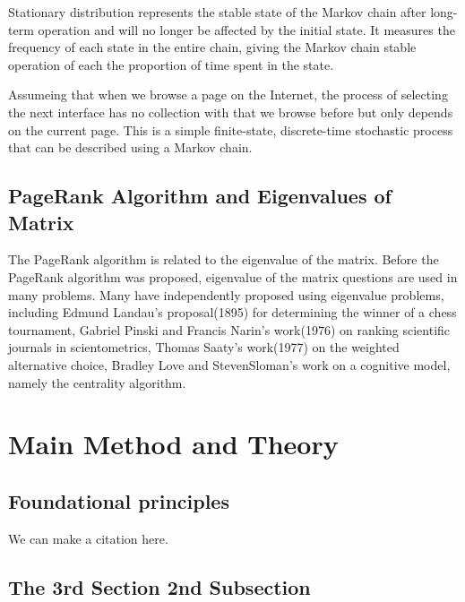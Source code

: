 \documentclass[lettersize,journal,12pt]{IEEEtran}
\begin{document}
Stationary distribution represents the stable state of the Markov chain after long-term operation and will no longer be affected by the initial state.
It measures the frequency of each state in the entire chain, giving the Markov chain stable operation of each
the proportion of time spent in the state.

Assumeing that when we browse a page on the Internet, the process of selecting the next interface has no collection with that we browse before but only depends on the current page. This is a simple finite-state, discrete-time stochastic process that can be described using a Markov chain.

\subsection{PageRank Algorithm and Eigenvalues of  Matrix}

The PageRank algorithm is related to the eigenvalue of the matrix. Before the PageRank algorithm was proposed, eigenvalue of the matrix questions are used in many problems. Many have independently proposed using eigenvalue problems, including Edmund Landau's proposal(1895) for determining the winner of a chess tournament, Gabriel Pinski and Francis Narin's work(1976) on ranking scientific journals in scientometrics, Thomas Saaty's work(1977) on the weighted alternative choice, Bradley Love and StevenSloman's work on a cognitive model, namely the centrality algorithm. 

\section{Main Method and Theory}

\subsection{Foundational principles}




We can make a citation here. \cite{ref1}



\subsection{The 3rd Section 2nd Subsection}
\end{document}
